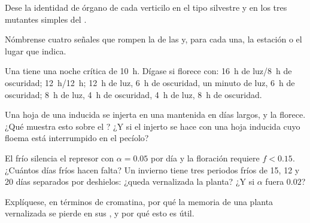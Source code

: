 \begin{exercise}[$\star$]\label{exo:b2:plant-flowering:3}
Dese la identidad de órgano de cada verticilo en el tipo silvestre y en
los tres mutantes simples del .
\end{exercise}

\begin{exercise}[$\star$]\label{exo:b2:plant-flowering:4}
Nómbrense cuatro señales que rompen la  de las  y, para
cada una, la estación o el lugar que indica.
\end{exercise}

\begin{exercise}[$\star\star$]\label{exo:b2:plant-flowering:5}
Una  tiene una noche crítica de \qty{10}{h}. Dígase si
florece con: \qty{16}{h} de luz/\qty{8}{h} de oscuridad; \qty{12}{h}/\qty{12}{h};
\qty{12}{h} de luz, \qty{6}{h} de oscuridad, un minuto de luz, \qty{6}{h} de oscuridad;
\qty{8}{h} de luz, \qty{4}{h} de oscuridad, \qty{4}{h} de luz, \qty{8}{h} de oscuridad.
\end{exercise}

\begin{exercise}[$\star\star$]\label{exo:b2:plant-flowering:6}
Una hoja de una  inducida se injerta en una  mantenida en días largos, y la  florece.
¿Qué muestra esto sobre el ? ¿Y si el injerto se hace con una
hoja inducida cuyo floema está interrumpido en el pecíolo?
\end{exercise}

\begin{exercise}[$\star\star$]\label{exo:b2:plant-flowering:7}
El frío silencia el represor con $\alpha = 0.05$ por día y la floración
requiere $f < 0.15$. ¿Cuántos días fríos hacen falta? Un invierno tiene
tres periodos fríos de 15, 12 y 20 días separados por deshielos: ¿queda
vernalizada la planta? ¿Y si $\alpha$ fuera $0.02$?
\end{exercise}

\begin{exercise}[$\star\star$]\label{exo:b2:plant-flowering:8}
Explíquese, en términos de cromatina, por qué la memoria de una planta
vernalizada se pierde en sus , y por qué esto es útil.
\end{exercise}

